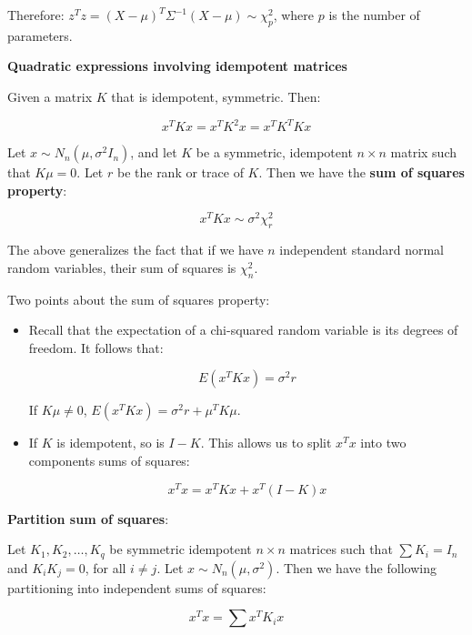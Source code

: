 Therefore: $z^T z = (X-\mu)^T  \Sigma^{-1} (X-\mu)\sim \chi_p^2$, where $p$ is the number of parameters.

\textbf{Quadratic expressions involving idempotent matrices}

Given a matrix $K$ that is idempotent, symmetric. Then:

\begin{equation}
x^T K x = x^T K^2 x = x^T K^T K x
\end{equation}

Let $x\sim N_n(\mu,\sigma^2 I_n)$, and let $K$ be a symmetric, idempotent $n \times n$ matrix such that $K\mu=0$. Let $r$ be the rank or trace of $K$. Then we have the \textbf{sum of squares property}:

\begin{equation}
x^T K x \sim \sigma^2 \chi_r^2
\end{equation}

The above generalizes the fact that if we have $n$ independent standard normal random variables, their sum of squares is $\chi_n^2$.

Two points about the sum of squares property:
\begin{itemize}
\item
Recall that the expectation of a chi-squared random variable is its degrees of freedom. It follows that:

\begin{equation}
E(x^T K x) =  \sigma^2 r 
\end{equation}

If $K\mu\neq 0$, $E(x^T K x) =  \sigma^2 r+\mu^T K\mu$. 

\item If $K$ is idempotent, so is $I-K$. This allows us to split $x^T x$ into two components sums of squares:

\begin{equation}
x^T x = x^T K x+x^T (I-K) x
\end{equation}
\end{itemize}

\textbf{Partition sum of squares}: 

 Let $K_1, K_2,\dots, K_q$ be symmetric idempotent $n \times n$ matrices such that
 $\sum K_i= I_n$ and $K_iK_j =0$, for all $i\neq j $. Let $x\sim N_n(\mu, \sigma^2)$.
 Then we have the following partitioning into independent sums of squares:
 
  \begin{equation}
x^T x = \sum x^T K_i x
\end{equation}

